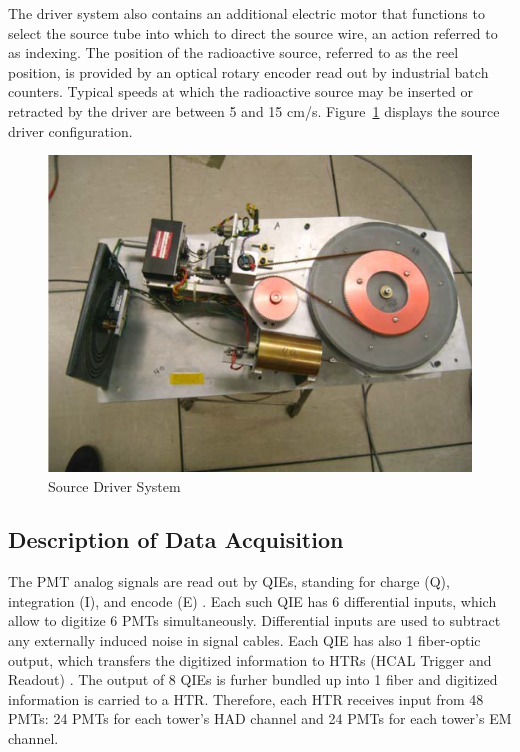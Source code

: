 The driver system also contains an additional electric motor that functions to
select the source tube into which to direct the source wire, an action referred
to as indexing. The position of the radioactive source, referred to as the reel position, is provided by an optical rotary
encoder read out by industrial batch counters. Typical speeds at which the
radioactive source may be inserted or retracted by the driver are between 5 and
15 cm/s. Figure~\ref{fig:hf_expsetup_sourcedriver} displays the source driver configuration.
\begin{figure}[htb]
   \begin{center}
      \includegraphics[width=.8\textwidth]{figures/ch_hfcalibration/Source_Driver.png}
      \caption{Source Driver System}
      \label{fig:hf_expsetup_sourcedriver}
   \end{center}
\end{figure}

\subsection{Description of Data Acquisition}
The PMT analog signals are read out by QIEs, standing for charge (Q),
integration (I), and encode (E) \cite{QIE-1}. Each such QIE has 6 differential inputs, which
allow to digitize 6 PMTs simultaneously. Differential inputs are used to subtract
any externally induced noise in signal cables. Each QIE has also 1 fiber-optic
output, which transfers the digitized information to HTRs (HCAL Trigger and
Readout) \cite{HTR}. The output of 8 QIEs is furher bundled up into 1 fiber and digitized information is carried to a HTR. Therefore, each HTR receives input from 48 PMTs: 24 PMTs for each tower's HAD channel and 24 PMTs for each tower's EM channel.

